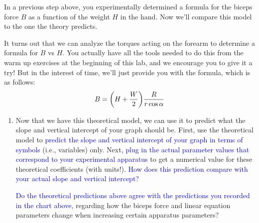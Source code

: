 \documentclass[11pt,letterpaper]{article}
\newcommand{\question}[2][blue]{\textcolor{#1}{#2}}
\newcommand{\yint}[1][]{vertical intercept\xspace}
\newcommand{\temp}[2][]{#1#2}
\begin{document}
In a previous step above,
you experimentally determined a formula for the biceps force $B$ as a function
of the weight $H$ in the hand.  
Now we'll compare this model to the one the theory predicts.

It turns out that we can analyze the torques acting on the forearm
to determine a formula for $B$ vs $H$.  You actually have all the tools needed
to do this from the warm up exercises at the beginning of this lab, and we
encourage you to give it a try!  But in the interest of time, we'll just
provide you with the formula, which is as follows:
\begin{equation*}
	B = {\left(  H + \frac{W}{2}  \right)}\frac{R}{r\cos\alpha}
\end{equation*}


\begin{enumerate}[labproc]

\item
Now that we have this theoretical model, 
we can use it to predict what the slope and \yint of your graph should be.
First, use the theoretical model to 
\question{predict the slope and \yint  
of your graph in terms of symbols} (i.e., variables) only.
Next, \question{plug in the actual parameter values 
that correspond to your experimental apparatus}
to get a numerical value for these theoretical coefficients (with units!).
\question{How does this prediction compare 
with your actual slope and \yint ?}

\question{Do the theoretical predictions above agree 
with the predictions you recorded in the chart above},
regarding how the biceps force and linear equation parameters change when
increasing certain apparatus parameters?

\end{enumerate}


\temp{\pagebreak}
\end{document}
